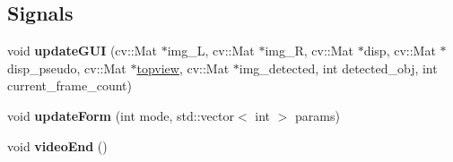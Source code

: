 \subsection*{Signals}
\begin{DoxyCompactItemize}
\item 
\hypertarget{classstereo__vision_afaa54843be42d382939a9b95df97a378}{}void {\bfseries update\+G\+U\+I} (cv\+::\+Mat $\ast$img\+\_\+\+L, cv\+::\+Mat $\ast$img\+\_\+\+R, cv\+::\+Mat $\ast$disp, cv\+::\+Mat $\ast$disp\+\_\+pseudo, cv\+::\+Mat $\ast$\hyperlink{class_top_view_a693454cfb21851b389634e28bdabe35a}{topview}, cv\+::\+Mat $\ast$img\+\_\+detected, int detected\+\_\+obj, int current\+\_\+frame\+\_\+count)\label{classstereo__vision_afaa54843be42d382939a9b95df97a378}

\item 
\hypertarget{classstereo__vision_aedbf17999d975ce6142527ffa9a32e24}{}void {\bfseries update\+Form} (int mode, std\+::vector$<$ int $>$ params)\label{classstereo__vision_aedbf17999d975ce6142527ffa9a32e24}

\item 
\hypertarget{classstereo__vision_a474c8ffdfea16eaac64e120bd6101b61}{}void {\bfseries video\+End} ()\label{classstereo__vision_a474c8ffdfea16eaac64e120bd6101b61}

\end{DoxyCompactItemize}
